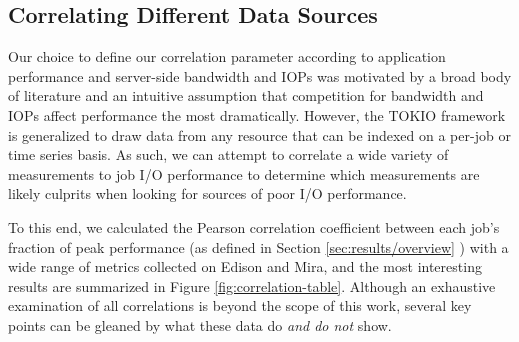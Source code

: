 \subsection{Correlating Different Data Sources} \label{sec:results/correlating}


Our choice to define our correlation parameter according to application performance and server-side bandwidth and IOPs was motivated by a broad body of literature and an intuitive assumption that competition for bandwidth and IOPs affect performance the most dramatically.
However, the TOKIO framework is generalized to draw data from any resource that can be indexed on a per-job or time series basis.
As such, we can attempt to correlate a wide variety of measurements to job I/O performance to determine which measurements are likely culprits when looking for sources of poor I/O performance.

To this end, we calculated the Pearson correlation coefficient between each job's fraction of peak performance (as defined in Section \ref{sec:results/overview} ) with a wide range of metrics collected on Edison and Mira, and the most interesting results are summarized in Figure \ref{fig:correlation-table}.
Although an exhaustive examination of all correlations is beyond the scope of this work, several key points can be gleaned by what these data do \emph{and do not} show.


